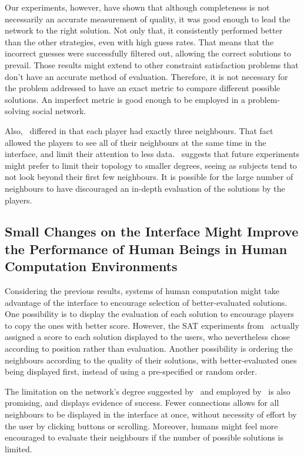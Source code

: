 \documentclass{article}
\begin{document}
Our experiments, however, have shown that although completeness is not necessarily an accurate measurement of quality, it was good enough to lead the network to the right solution. Not only that, it consistently performed better than the other strategies, even with high guess rates. That means that the incorrect guesses were successfully filtered out, allowing the correct solutions to prevail. Those results might extend to other constraint satisfaction problems that don't have an accurate method of evaluation. Therefore, it is not necessary for the problem addressed to have an exact metric to compare different possible solutions. An imperfect metric is good enough to be employed in a problem-solving social network. 

Also,~\cite{mason:collablearnet} differed in that each player had exactly three neighbours. That fact allowed the players to see all of their neighbours at the same time in the interface, and limit their attention to less data.~\cite{farenzena:collabem} suggests that future experiments might prefer to limit their topology to smaller degrees, seeing as subjects tend to not look beyond their first few neighbours. It is possible for the large number of neighbours to have discouraged an in-depth evaluation of the solutions by the players.

\subsection{Small Changes on the Interface Might Improve the Performance of Human Beings in Human Computation Environments}

Considering the previous results, systems of human computation might take advantage of the interface to encourage selection of better-evaluated solutions. One possibility is to display the evaluation of each solution to encourage players to copy the ones with better score. However, the SAT experiments from~\cite{farenzena:collabem} actually assigned a score to each solution displayed to the users, who nevertheless chose according to position rather than evaluation. Another possibility is ordering the neighbours according to the quality of their solutions, with better-evaluated ones being displayed first, instead of using a pre-specified or random order.

The limitation on the network's degree suggested by~\cite{farenzena:collabem} and employed by~\cite{mason:collablearnet} is also promising, and displays evidence of success. Fewer connections allows for all neighbours to be displayed in the interface at once, without necessity of effort by the user by clicking buttons or scrolling. Moreover, humans might feel more encouraged to evaluate their neighbours if the number of possible solutions is limited.
%
\end{document}
